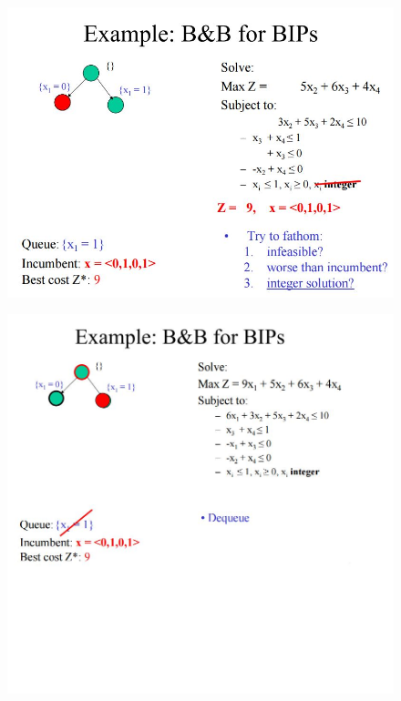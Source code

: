 \documentclass{beamer}
\begin{document}
\begin{frame}
	\begin{figure}
		\centering
		\includegraphics[width=1.0\linewidth]{BB-BIP/BB-BIP11}
	\end{figure}
\end{frame}
\begin{frame}
	\begin{figure}
		\centering
		\includegraphics[width=1.1\linewidth]{BB-BIP/BB-BIP12}
	\end{figure}
\end{frame}
\end{document}
